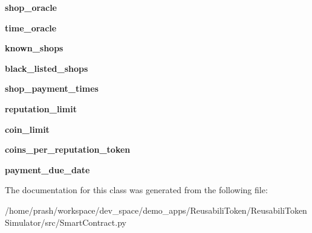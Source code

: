 \begin{DoxyCompactItemize}
\item 
\mbox{\label{class_smart_contract_1_1_smart_contract_a853b82ee28145c31bc84edfb49d8f738}} 
{\bfseries shop\+\_\+oracle}
\item 
\mbox{\label{class_smart_contract_1_1_smart_contract_a626920b945f3db381cebfd954841cf53}} 
{\bfseries time\+\_\+oracle}
\item 
\mbox{\label{class_smart_contract_1_1_smart_contract_ae0e02f2e9cc6a545af44c991ea1733f2}} 
{\bfseries known\+\_\+shops}
\item 
\mbox{\label{class_smart_contract_1_1_smart_contract_acf3c38cefa3e90afea71f95d52256abf}} 
{\bfseries black\+\_\+listed\+\_\+shops}
\item 
\mbox{\label{class_smart_contract_1_1_smart_contract_a9a909027ab1003841affa9ecefc1932b}} 
{\bfseries shop\+\_\+payment\+\_\+times}
\item 
\mbox{\label{class_smart_contract_1_1_smart_contract_aeef5c2db8e7e5a28a0240920df945ac9}} 
{\bfseries reputation\+\_\+limit}
\item 
\mbox{\label{class_smart_contract_1_1_smart_contract_a74af331bec11a97e791160cd7062c930}} 
{\bfseries coin\+\_\+limit}
\item 
\mbox{\label{class_smart_contract_1_1_smart_contract_a250470e354f6452ef45f3b28f45eb839}} 
{\bfseries coins\+\_\+per\+\_\+reputation\+\_\+token}
\item 
\mbox{\label{class_smart_contract_1_1_smart_contract_a499c8ec7d970a801486ad62b5b422973}} 
{\bfseries payment\+\_\+due\+\_\+date}
\end{DoxyCompactItemize}


The documentation for this class was generated from the following file\+:\begin{DoxyCompactItemize}
\item 
/home/prash/workspace/dev\+\_\+space/demo\+\_\+apps/\+Reusabili\+Token/\+Reusabili\+Token\+Simulator/src/Smart\+Contract.\+py\end{DoxyCompactItemize}
